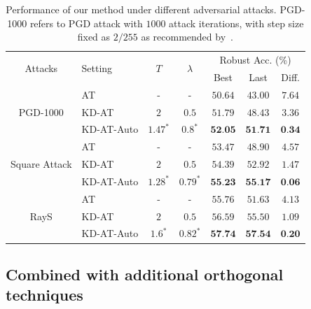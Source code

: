 \begin{table}[!ht]
  \small
  \caption{Performance of our method under different adversarial attacks. PGD-1000 refers to PGD attack with $1000$ attack iterations, with step size fixed as $2/255$ as recommended by~\citet{Croce2020ReliableEO}.
   }
  \vspace{0.5ex}
  \label{table:result-evaluation}
  \centering
  \small
  \begin{tabular}{clccccc}
    \toprule
    \multirow{2}{*}{Attacks} & \multirow{2}{*}{Setting} & \multirow{2}{*}{$T$} & \multirow{2}{*}{$\lambda$} & \multicolumn{3}{c}{Robust Acc. (\%)} \\
     & & &  & Best & Last & Diff. \\
\multirow{3}{*}{PGD-1000} 
& AT & - & - &  $50.64$ & $43.00$ & $ 7.64$ \\
 & KD-AT & $2$ & $0.5$ &  $51.79$ & $48.43$ & $ 3.36$ \\ 
 & KD-AT-Auto & $1.47^*$ & $0.8^*$ &  $\textbf{52.05}$ & $\textbf{51.71}$ & $\textbf{0.34}$ \\ 
    \midrule
\multirow{3}{*}{Square Attack}
& AT & - & - & $53.47$ & $48.90$ & $4.57$ \\ 
& KD-AT & $2$ & $0.5$ &  $54.39$ & $52.92$ & $ 1.47$ \\ 
& KD-AT-Auto & $1.28^*$ & $0.79^*$ & $\textbf{55.23}$ & $\textbf{55.17}$ & $\textbf{0.06}$\\ 
    \midrule
\multirow{3}{*}{RayS}
& AT & - & - &  $55.76$ & $51.63$ & $ 4.13$ \\ 
& KD-AT & $2$ & $0.5$ & $56.59$ & $55.50$ & $ 1.09$ \\ 
& KD-AT-Auto & $1.6^*$ & $0.82^*$ &  $\textbf{57.74}$ & $\textbf{57.54}$ & $\textbf{0.20}$ \\ 

    \bottomrule
  \end{tabular}
\end{table}

\FloatBarrier





    
\subsection{Combined with additional orthogonal techniques}
\label{sect:additional-technique}

